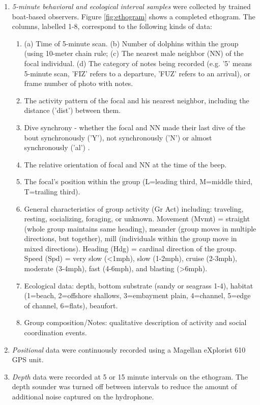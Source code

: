 \documentclass[11pt]{amsart}
\begin{document}
\begin{enumerate}[label*=\arabic*.]
\item \emph{5-minute behavioral and ecological interval samples} were collected by trained boat-based observers. Figure \ref{fig:ethogram} shows a completed ethogram. The columns, labelled 1-8, correspond to the following kinds of data: 
\begin{enumerate}[label*=\arabic*.]
\item (a) Time of 5-minute scan. (b) Number of dolphins within the group (using 10-meter chain rule; \citep{smolker:1992} (c) The nearest male neighbor (NN) of the focal individual. (d) The category of notes being recorded (e.g. '5' means 5-minute scan, 'FIZ' refers to a departure, 'FUZ' refers to an arrival), or frame number of photo with notes. 
\item The activity pattern of the focal and his nearest neighbor, including the distance ('dist') between them.
\item Dive synchrony - whether the focal and NN made their last dive of the bout synchronously ('Y'), not synchronously ('N') or almost synchronously ('al') \citep[see][]{connor:2006}.
\item The relative orientation of focal and NN at the time of the beep. 
\item The focal's position within the group (L=leading third, M=middle third, T=trailing third). 
\item General characteristics of group activity (Gr Act) including: traveling, resting, socializing, foraging, or unknown. Movement (Mvmt) = straight (whole group maintains same heading), meander (group moves in multiple directions, but together), mill (individuals within the group move in mixed directions). Heading (Hdg) = cardinal direction of the group. Speed (Spd) = very slow (\textless1mph), slow (1-2mph), cruise (2-3mph), moderate (3-4mph), fast (4-6mph), and blasting (\textgreater6mph).  
\item Ecological data: depth, bottom substrate (sandy or seagrass 1-4), habitat (1=beach, 2=offshore shallows, 3=embayment plain, 4=channel, 5=edge of channel, 6=flats), beaufort. 
\item Group composition/Notes: qualitative description of activity and social coordination events.
\end{enumerate}

\item \emph{Positional} data were continuously recorded using a Magellan eXplorist 610 GPS unit.
\item \emph{Depth} data were recorded at 5 or 15 minute intervals on the ethogram. The depth sounder was turned off between intervals to reduce the amount of additional noise captured on the hydrophone.
\end{enumerate}
\end{document}
